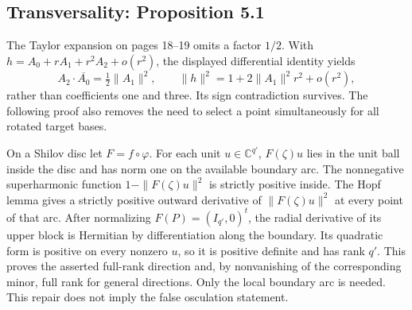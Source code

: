 \documentclass[10pt]{article}
\begin{document}
\subsection*{Transversality: Proposition 5.1}
The Taylor expansion on pages 18–19 omits a factor \(1/2\). With \(h=A_0+rA_1+r^2A_2+o(r^2)\), the displayed differential identity yields \[A_2\cdot\overline{A_0}=\tfrac12\|A_1\|^2,\qquad
 \|h\|^2=1+2\|A_1\|^2r^2+o(r^2),\] rather than coefficients one and three. Its sign contradiction survives. The following proof also removes the need to select a point simultaneously for all rotated target bases.\par
On a Shilov disc let \(F=f\circ\varphi\). For each unit \(u\in\mathbb C^{q'}\), \(F(\zeta)u\) lies in the unit ball inside the disc and has norm one on the available boundary arc. The nonnegative superharmonic function \(1-\|F(\zeta)u\|^2\) is strictly positive inside. The Hopf lemma gives a strictly positive outward derivative of \(\|F(\zeta)u\|^2\) at every point of that arc. After normalizing \(F(P)=(I_{q'},0)^t\), the radial derivative of its upper block is Hermitian by differentiation along the boundary. Its quadratic form is positive on every nonzero \(u\), so it is positive definite and has rank \(q'\). This proves the asserted full-rank direction and, by nonvanishing of the corresponding minor, full rank for general directions. Only the local boundary arc is needed. This repair does not imply the false osculation statement.\par
\end{document}
